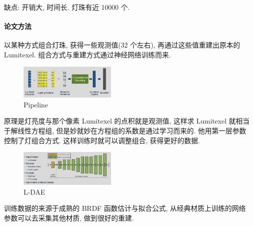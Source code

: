 缺点: 开销大, 时间长. 灯珠有近 10000 个.

\paragraph{论文方法} 以某种方式组合灯珠, 获得一些观测值(32 个左右), 再通过这些值重建出原本的 Lumitexel. 组合方式与重建方式通过神经网络训练而来.

\begin{figure}[!htb]
    \centering
    \includegraphics[width=0.42\textwidth]{pic/ACG4/pipline.png}
    \caption{Pipeline}
\end{figure}

原理是灯亮度与那个像素 Lumitexel 的点积就是观测值, 这样求 Lumitexel 就相当于解线性方程组, 但是妙就妙在方程组的系数是通过学习而来的. 他用第一层参数控制了灯组合方式. 这样训练时就可以调整组合, 获得更好的数据. 

\begin{figure}[!htb]
    \centering
    \includegraphics[width=0.42\textwidth]{pic/ACG4/L-DAE.png}
    \caption{L-DAE}
\end{figure}

训练数据的来源于成熟的 BRDF 函数估计与拟合公式, 从经典材质上训练的网络参数可以去采集其他材质, 做到很好的重建. 